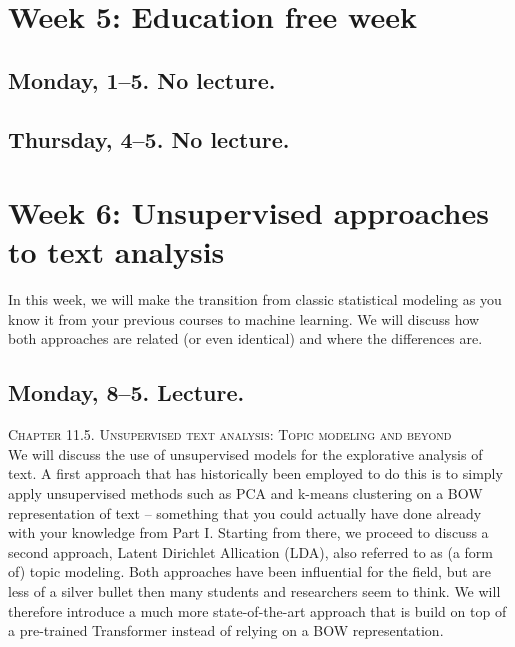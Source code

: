 
\section*{Week 5:  Education free week}
\subsection*{Monday, 1--5. No lecture.}
\subsection*{Thursday, 4--5. No lecture.}



\section*{Week 6: Unsupervised approaches to text analysis}
In this week, we will make the transition from classic statistical modeling as you know it from your previous courses to machine learning. We will discuss how both approaches are related  (or even identical) and where the differences are.


\subsection*{Monday, 8--5. Lecture.}
\textsc{ Chapter 11.5. Unsupervised text analysis: Topic modeling and beyond}\\

We will discuss the use of unsupervised models for the explorative analysis of text.
A first approach that has historically been employed to do this is to simply apply unsupervised methods such as PCA and k-means clustering on a BOW representation of text -- something that you could actually have done already with your knowledge from Part I. Starting from there, we proceed to discuss a second approach, Latent Dirichlet Allication (LDA), also referred to as (a form of) topic modeling.
Both approaches have been influential for the field, but are less of a silver bullet then many students and researchers seem to think. We will therefore introduce a much more state-of-the-art approach that is build on top of a pre-trained Transformer instead of relying on a BOW representation.

